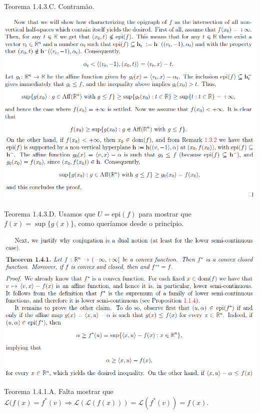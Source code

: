 \documentclass[12pt]{article}
\begin{document}
Teorema 1.4.3.C. Contram\~ao.


\vspace{300mm}

		\begin{center}
		\includegraphics[scale=.9]{9}
		\end{center}

Teorema 1.4.3.D. Usamos que $U = \text{epi}(f)$ para mostrar que $f(x) = \sup \{ g(x) \}$, como quer\'iamos desde o princ\'ipio.

\vspace{300mm}

		\begin{center}
		\includegraphics{10}
		\end{center}

Teorema 1.4.1.A. Falta mostrar que $\mathcal{L}(f(x) = f^*(v) \Rightarrow \mathcal{L}(\mathcal{L}(f(x))) = \mathcal{L}(f^*(v)) = f(x)$.

\vspace{300mm}
\end{document}
